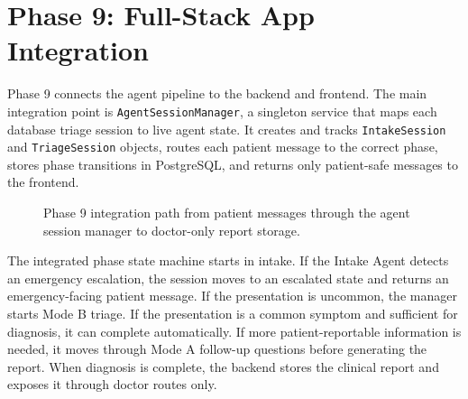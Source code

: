 \section{Phase 9: Full-Stack App Integration}

Phase 9 connects the agent pipeline to the backend and frontend. The main integration point is \texttt{AgentSessionManager}, a singleton service that maps each database triage session to live agent state. It creates and tracks \texttt{IntakeSession} and \texttt{TriageSession} objects, routes each patient message to the correct phase, stores phase transitions in PostgreSQL, and returns only patient-safe messages to the frontend.

\begin{figure}[htbp]
\centering
{}
\caption{Phase 9 integration path from patient messages through the agent session manager to doctor-only report storage.}
\label{fig:phase9_full_stack_integration}
\end{figure}

The integrated phase state machine starts in intake. If the Intake Agent detects an emergency escalation, the session moves to an escalated state and returns an emergency-facing patient message. If the presentation is uncommon, the manager starts Mode B triage. If the presentation is a common symptom and sufficient for diagnosis, it can complete automatically. If more patient-reportable information is needed, it moves through Mode A follow-up questions before generating the report. When diagnosis is complete, the backend stores the clinical report and exposes it through doctor routes only.

